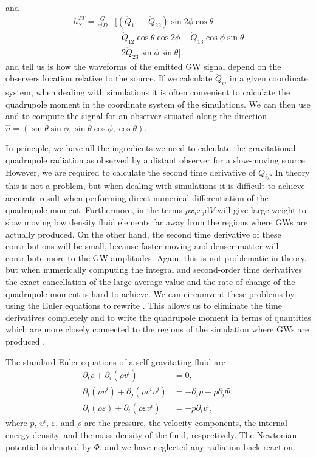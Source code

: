 and
\begin{align}
\label{eqT:hc}
h_{\times}^{TT} = \frac{G}{c^4 D} & \Big[ (\ddot{Q}_{11} - \ddot{Q}_{22}) \sin{2\phi}\cos{\theta}\\ \nonumber
& +\ddot{Q}_{12} \cos{\theta} \cos{2\phi} - \ddot{Q}_{13} \cos{\phi} \sin{\theta} \\ \nonumber
& +  2\ddot{Q}_{23} \sin{\phi} \sin{\theta} \Big]. 
\end{align}
 and  tell us is how the waveforms of the emitted GW signal depend on 
the observers location relative to the source.
If we calculate $\ddot{Q}_{ij}$ in a given coordinate system, 
when dealing with simulations it is often convenient to calculate the quadrupole moment
in the coordinate system of the simulations. We can then use  and  to compute the signal for an observer situated along the direction $\hat{n} = (\sin{\theta} \sin{\phi}, \sin{\theta} \cos{\phi},\cos{\theta})$.

In principle, we have all the ingredients we need to calculate the gravitational quadrupole radiation as observed by a distant observer 
for a slow-moving source. However, we are required to calculate the second time derivative of $Q_{ij}$. In theory this is not a problem, but
when dealing with simulations it is difficult to achieve accurate result when performing direct numerical differentiation of the
quadrupole moment. 
Furthermore, in  the terms $\rho x_i x_j \mathrm{d} V$ will give large weight to
slow moving low density fluid elements far away from the regions where GWs are actually produced. 
On the other hand, the second time derivative of these contributions
will be small, because faster moving and denser matter will contribute more to the GW amplitudes.  
Again, this is not problematic in theory, but when numerically computing the integral and second-order time derivatives 
the exact cancellation of the large average value and the rate of change of the quadrupole moment is hard to achieve.
We can circumvent these problems by using the Euler equations to rewrite . This allows us to
eliminate the time derivatives completely and to write the quadrupole moment in terms of quantities 
which are more closely connected to the regions of the simulation where GWs are produced \citep{oohara_97,finn_89,blanchet_90}.

The standard Euler equations of a self-gravitating fluid are
\begin{subequations} 
\begin{align}
\partial_t \rho + \partial_i (\rho v^i) &= 0, \label{eqT:cont} \\  
\partial_t (\rho v^i) + \partial_j (\rho v^i v^j) & = -\partial_i p - \rho \partial_i \Phi, \label{eqT:mom} \\ 
\partial_t (\rho \varepsilon) + \partial_i (\rho \varepsilon v^i) & = -p \partial_i v^i, \label{eqT:enrg} 
\end{align}
\end{subequations}
where $p$, $v^i$, $\varepsilon$, and $\rho$ are the pressure, the velocity components, the internal energy density,
and the mass density of the fluid, respectively. The Newtonian potential is denoted by $\Phi$, and we have 
neglected any radiation back-reaction.  

